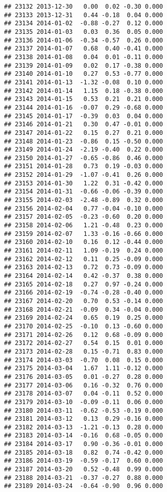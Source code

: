 \documentclass[
]{article}
\begin{document}
\begin{verbatim}
## 23132 2013-12-30   0.00  0.02 -0.30 0.000
## 23133 2013-12-31   0.44 -0.18  0.04 0.000
## 23134 2014-01-02  -0.88 -0.27  0.12 0.000
## 23135 2014-01-03   0.03  0.36  0.05 0.000
## 23136 2014-01-06  -0.34 -0.57  0.26 0.000
## 23137 2014-01-07   0.68  0.40 -0.41 0.000
## 23138 2014-01-08   0.04  0.01 -0.11 0.000
## 23139 2014-01-09   0.02  0.17 -0.38 0.000
## 23140 2014-01-10   0.27  0.53 -0.77 0.000
## 23141 2014-01-13  -1.32 -0.08  0.10 0.000
## 23142 2014-01-14   1.15  0.18 -0.38 0.000
## 23143 2014-01-15   0.53  0.21  0.21 0.000
## 23144 2014-01-16  -0.07  0.29 -0.68 0.000
## 23145 2014-01-17  -0.39  0.03  0.04 0.000
## 23146 2014-01-21   0.30  0.47 -0.01 0.000
## 23147 2014-01-22   0.15  0.27  0.21 0.000
## 23148 2014-01-23  -0.86  0.15 -0.50 0.000
## 23149 2014-01-24  -2.19 -0.40  0.22 0.000
## 23150 2014-01-27  -0.65 -0.86  0.46 0.000
## 23151 2014-01-28   0.73  0.19 -0.03 0.000
## 23152 2014-01-29  -1.07 -0.41  0.26 0.000
## 23153 2014-01-30   1.22  0.31 -0.42 0.000
## 23154 2014-01-31  -0.66 -0.06 -0.39 0.000
## 23155 2014-02-03  -2.48 -0.89  0.32 0.000
## 23156 2014-02-04   0.77 -0.04 -0.10 0.000
## 23157 2014-02-05  -0.23 -0.60  0.20 0.000
## 23158 2014-02-06   1.21 -0.48  0.23 0.000
## 23159 2014-02-07   1.33 -0.16 -0.66 0.000
## 23160 2014-02-10   0.16  0.12 -0.44 0.000
## 23161 2014-02-11   1.09 -0.19  0.24 0.000
## 23162 2014-02-12   0.11  0.25 -0.09 0.000
## 23163 2014-02-13   0.72  0.73 -0.09 0.000
## 23164 2014-02-14   0.42 -0.37  0.38 0.000
## 23165 2014-02-18   0.27  0.97 -0.24 0.000
## 23166 2014-02-19  -0.74 -0.28 -0.40 0.000
## 23167 2014-02-20   0.70  0.53 -0.14 0.000
## 23168 2014-02-21  -0.09  0.34 -0.04 0.000
## 23169 2014-02-24   0.65  0.19  0.25 0.000
## 23170 2014-02-25  -0.10  0.13 -0.60 0.000
## 23171 2014-02-26   0.12  0.68 -0.09 0.000
## 23172 2014-02-27   0.54  0.15  0.01 0.000
## 23173 2014-02-28   0.15 -0.71  0.83 0.000
## 23174 2014-03-03  -0.70  0.08  0.15 0.000
## 23175 2014-03-04   1.67  1.11 -0.12 0.000
## 23176 2014-03-05   0.01 -0.27  0.28 0.000
## 23177 2014-03-06   0.16 -0.32  0.76 0.000
## 23178 2014-03-07   0.04 -0.11  0.52 0.000
## 23179 2014-03-10  -0.09 -0.11  0.06 0.000
## 23180 2014-03-11  -0.62 -0.53 -0.19 0.000
## 23181 2014-03-12   0.13  0.29 -0.16 0.000
## 23182 2014-03-13  -1.21 -0.13  0.28 0.000
## 23183 2014-03-14  -0.16  0.68 -0.05 0.000
## 23184 2014-03-17   0.90 -0.36 -0.01 0.000
## 23185 2014-03-18   0.82  0.74 -0.42 0.000
## 23186 2014-03-19  -0.59 -0.17  0.60 0.000
## 23187 2014-03-20   0.52 -0.48  0.99 0.000
## 23188 2014-03-21  -0.37 -0.27  0.88 0.000
## 23189 2014-03-24  -0.64 -0.90  0.96 0.000

\end{verbatim}
\end{document}
